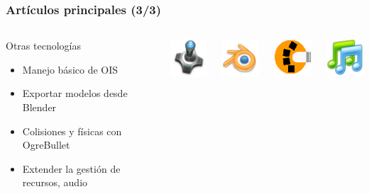 \documentclass[green]{beamer}
\begin{document}
\begin{frame}
\transdissolve
    \frametitle{Artículos principales (3/3)}
        
    \begin{columns}[c]
    \column{200pt}
        
	\begin{block}{Otras tecnologías}
            \begin{itemize}
                \item Manejo básico de OIS
		\item Exportar modelos desde Blender
		\item Colisiones y físicas con OgreBullet
		\item Extender la gestión de recursos, audio
            \end{itemize}            
        \end{block}

    \column{100pt}
        
	\begin{center}
	    \includegraphics[scale=0.45]{img/joystick.png}
	\end{center}
	
	\begin{center}
	    \includegraphics[scale=0.45]{img/blender-icono.png}
	\end{center}
	
	\begin{center}
	    \includegraphics[scale=0.45]{img/ogrebullet.png}
	\end{center}
	
	\begin{center}
	    \includegraphics[scale=0.45]{img/musica.png}
	\end{center}
    \end{columns} 
\end{frame}
\end{document}
